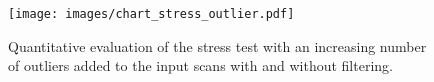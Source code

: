 \begin{figure}[!t]
  \texttt{[image: images/chart\_stress\_outlier.pdf]}
  \caption{Quantitative evaluation of the stress test with an increasing number of outliers added to the input scans with and without filtering.}
  \label{fig:chart_stress_outlier}
\end{figure}
